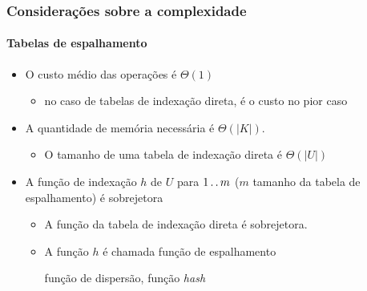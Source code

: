 \documentclass{beamer}
\begin{document}
\begin{frame}

  \frametitle{Considerações sobre a complexidade}
  \framesubtitle{Tabelas de espalhamento}

  \begin{itemize}

    \item O \alert{custo médio} das operações é $\Theta(1)$

      \begin{itemize}

        \item no caso de tabelas de indexação direta, é o custo no \alert{pior caso}

      \end{itemize}
   
    \item A quantidade de memória necessária é $\Theta( | K | )$.

      \begin{itemize}

        \item O tamanho de uma tabela de indexação direta é $\Theta(| U |)$

      \end{itemize}

    \item A função de indexação $h$ de $U$ para $1 \mathinner{\ldotp\ldotp} m$ ($m$ tamanho da tabela
      de espalhamento) é \alert{sobrejetora}

      \begin{itemize}

        \item A função da tabela de indexação direta é sobrejetora.

        \item A função $h$ é chamada \alert{função de espalhamento}

          função de dispersão, função \textit{hash\/}

      \end{itemize}

  \end{itemize}
      
\end{frame}
\end{document}
